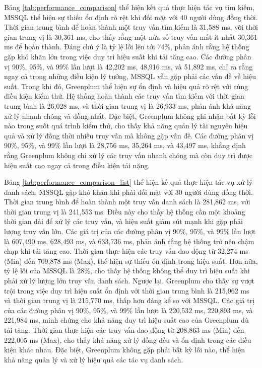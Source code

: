 Bảng \ref{tab:performance_comparison} thể hiện kết quả thực hiện tác vụ tìm kiếm, MSSQL thể hiện sự thiếu ổn định rõ rệt khi đối mặt với 40 người dùng đồng thời. Thời gian trung bình để hoàn thành một truy vấn tìm kiếm là 31,588 ms, với thời gian trung vị là 30,361 ms, cho thấy rằng một nửa số truy vấn mất ít nhất 30,361 ms để hoàn thành. Đáng chú ý là tỷ lệ lỗi lên tới 74\%, phản ánh rằng hệ thống gặp khó khăn lớn trong việc duy trì hiệu suất khi tải tăng cao. Các đường phân vị 90\%, 95\%, và 99\% lần lượt là 42,202 ms, 48,916 ms, và 51,892 ms, chỉ ra rằng ngay cả trong những điều kiện lý tưởng, MSSQL vẫn gặp phải các vấn đề về hiệu suất. Trong khi đó, Greenplum thể hiện sự ổn định và hiệu quả rõ rệt với cùng điều kiện kiểm thử. Hệ thống hoàn thành các truy vấn tìm kiếm với thời gian trung bình là 26,028 ms, và thời gian trung vị là 26,933 ms, phản ánh khả năng xử lý nhanh chóng và đồng nhất. Đặc biệt, Greenplum không ghi nhận bất kỳ lỗi nào trong suốt quá trình kiểm thử, cho thấy khả năng quản lý tài nguyên hiệu quả và xử lý đồng thời nhiều truy vấn mà không gặp vấn đề. Các đường phân vị 90\%, 95\%, và 99\% lần lượt là 28,756 ms, 35,264 ms, và 43,497 ms, khẳng định rằng Greenplum không chỉ xử lý các truy vấn nhanh chóng mà còn duy trì được hiệu suất cao ngay cả trong điều kiện tải nặng.

Bảng \ref{tab:performance_comparison_list} thể hiện kế quả thực hiện tác vụ xử lý danh sách, MSSQL gặp khó khăn khi phải đối mặt với 30 người dùng đồng thời. Thời gian trung bình để hoàn thành một truy vấn danh sách là 281,862 ms, với thời gian trung vị là 241,553 ms. Điều này cho thấy hệ thống cần một khoảng thời gian dài để xử lý các truy vấn, và hiệu suất giảm sút mạnh khi gặp phải lượng truy vấn lớn. Các giá trị của các đường phân vị 90\%, 95\%, và 99\% lần lượt là 607,490 ms, 628,493 ms, và 633,736 ms, phản ánh rằng hệ thống trở nên chậm chạp khi tải tăng cao. Thời gian thực hiện các truy vấn dao động từ 32,274 ms (Min) đến 709,878 ms (Max), thể hiện sự thiếu ổn định trong hiệu suất. Hơn nữa, tỷ lệ lỗi của MSSQL là 28\%, cho thấy hệ thống không thể duy trì hiệu suất khi phải xử lý lượng lớn truy vấn danh sách. Ngược lại, Greenplum cho thấy sự vượt trội trong việc duy trì hiệu suất ổn định với thời gian trung bình là 215,962 ms và thời gian trung vị là 215,770 ms, thấp hơn đáng kể so với MSSQL. Các giá trị của các đường phân vị 90\%, 95\%, và 99\% lần lượt là 220,532 ms, 220,893 ms, và 221,984 ms, minh chứng cho khả năng duy trì hiệu suất cao của Greenplum dù tải tăng. Thời gian thực hiện các truy vấn dao động từ 208,863 ms (Min) đến 222,005 ms (Max), cho thấy khả năng xử lý đồng đều và ổn định trong các điều kiện khác nhau. Đặc biệt, Greenplum không gặp phải bất kỳ lỗi nào, thể hiện khả năng quản lý và xử lý hiệu quả các tác vụ danh sách.

